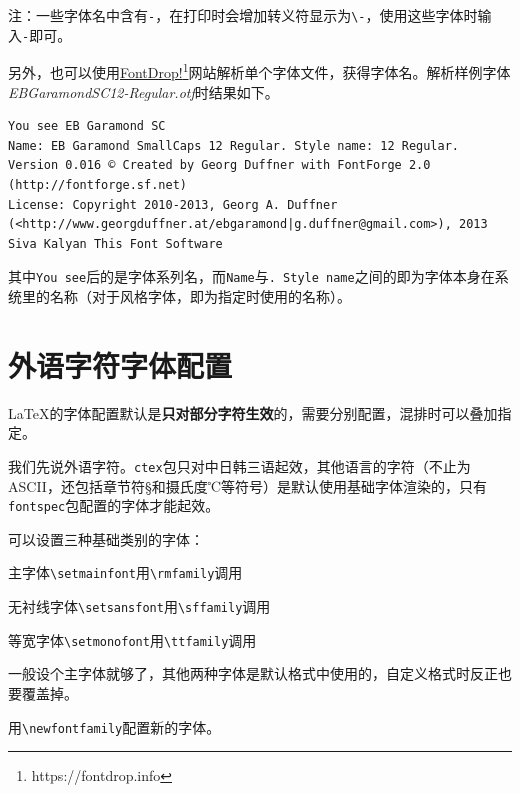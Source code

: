 \documentclass[10pt,openany]{book}
\begin{document}
注：一些字体名中含有\texttt{-}，在打印时会增加转义符显示为\texttt{\textbackslash{}-}，使用这些字体时输入\texttt{-}即可。

另外，也可以使用\href{https://fontdrop.info}{FontDrop!\footnote{https://fontdrop.info}}网站解析单个字体文件，获得字体名。解析样例字体\emph{EBGaramondSC12-Regular.otf}时结果如下。

\begin{lstlisting}[title=FontDrop!解析结果]
You see EB Garamond SC
Name: EB Garamond SmallCaps 12 Regular. Style name: 12 Regular. Version 0.016 © Created by Georg Duffner with FontForge 2.0 (http://fontforge.sf.net)
License: Copyright 2010-2013, Georg A. Duffner (<http://www.georgduffner.at/ebgaramond|g.duffner@gmail.com>), 2013 Siva Kalyan This Font Software  
\end{lstlisting}

其中\texttt{You\ see}后的是字体系列名，而\texttt{Name}与\texttt{.\ Style\ name}之间的即为字体本身在系统里的名称（对于风格字体，即为指定时使用的名称）。

\section{外语字符字体配置}

\LaTeX 的字体配置默认是\textbf{只对部分字符生效}的，需要分别配置，混排时可以叠加指定。

我们先说外语字符。\texttt{ctex}包只对中日韩三语起效，其他语言的字符（不止为ASCII，还包括章节符\S 和摄氏度{\songtien℃}等符号）是默认使用基础字体渲染的，只有\texttt{fontspec}包配置的字体才能起效。



可以设置三种基础类别的字体：

\begin{tightitem}
    \item 主字体\texttt{\textbackslash{}setmainfont}用\texttt{\textbackslash{}rmfamily}调用
    \item 无衬线字体\texttt{\textbackslash{}setsansfont}用\texttt{\textbackslash{}sffamily}调用
    \item 等宽字体\texttt{\textbackslash{}setmonofont}用\texttt{\textbackslash{}ttfamily}调用
\end{tightitem}

一般设个主字体就够了，其他两种字体是默认格式中使用的，自定义格式时反正也要覆盖掉。

用\texttt{\textbackslash{}newfontfamily}配置新的字体。
\end{document}
